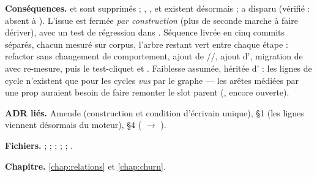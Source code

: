 \textbf{Conséquences.}  et
 sont supprimés ; ,
,  et
 existent désormais ; 
a disparu (vérifié : absent à \code{\snapshotCommit}). L'issue  est
fermée \emph{par construction} (plus de seconde marche à faire dériver), avec
un test de régression dans . Séquence livrée en
cinq commits séparés, chacun mesuré sur corpus, l'arbre restant vert entre
chaque étape : refactor sans changement de comportement, ajout de
//, ajout d',
migration de  avec re-mesure, puis le test-cliquet et
. Faiblesse assumée, héritée d' : les lignes
de cycle n'existent que pour les cycles \emph{vus} par le graphe --- les
arêtes médiées par une prop auraient besoin de faire remonter le slot parent
(, encore ouverte).

\textbf{ADR liés.} Amende  (construction et condition d'écrivain
unique),  §1 (les lignes viennent désormais du moteur),  §4
( $\to$ ).

\textbf{Fichiers.}  ;
 ;  ;
 ;  ;
.

\textbf{Chapitre.} \cref{chap:relations} et \cref{chap:churn}.


